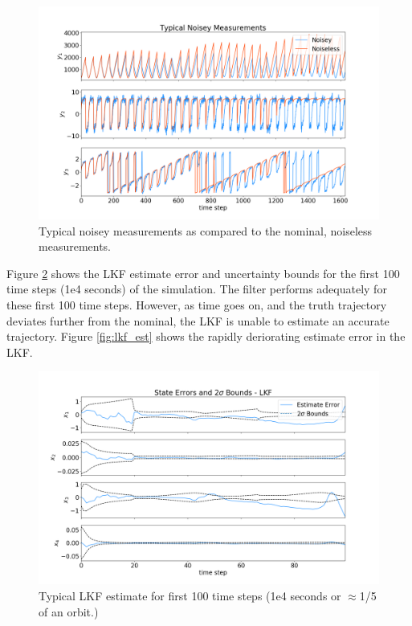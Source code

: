 \documentclass[11pt, a4paper]{article}
\begin{document}
\begin{figure}[H]
	\centering
	\includegraphics[width=\textwidth]{Figures/noisey_meas.png}
	\caption{Typical noisey measurements as compared to the nominal, noiseless measurements.}
	\label{fig:noisey_meas}
\end{figure}

Figure \ref{fig:lkf_est_zoom} shows the LKF estimate error and uncertainty bounds for the first 100 time steps (1e4 seconds) of the simulation. 
The filter performs adequately for these first 100 time steps.
However, as time goes on, and the truth trajectory deviates further from the nominal, the LKF is unable to estimate an accurate trajectory. 
Figure \ref{fig:lkf_est} shows the rapidly deriorating estimate error in the LKF.  

\begin{figure}[H]
	\centering
	\includegraphics[width=\textwidth]{Figures/lkf_estimate_th_ZOOM.png}
	\caption{Typical LKF estimate for first 100 time steps (1e4 seconds or $\approx$1/5 of an orbit.)}
	\label{fig:lkf_est_zoom}
\end{figure}
\end{document}
